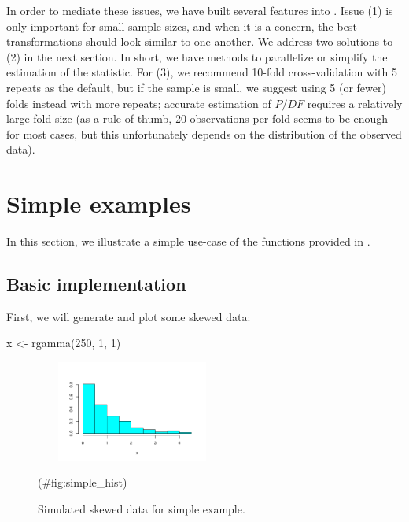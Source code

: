 In order to mediate these issues, we have built several features into
. Issue (1) is only important for small sample sizes,
and when it is a concern, the best transformations should look similar
to one another. We address two solutions to (2) in the next section. In
short, we have methods to parallelize or simplify the estimation of the
statistic. For (3), we recommend 10-fold cross-validation with 5 repeats
as the default, but if the sample is small, we suggest using 5 (or
fewer) folds instead with more repeats; accurate estimation of \(P/DF\)
requires a relatively large fold size (as a rule of thumb, 20
observations per fold seems to be enough for most cases, but this
unfortunately depends on the distribution of the observed data).

\hypertarget{simple-examples}{%
\section{Simple examples}\label{simple-examples}}

In this section, we illustrate a simple use-case of the functions
provided in .

\hypertarget{basic-implementation}{%
\subsection{Basic implementation}\label{basic-implementation}}

First, we will generate and plot some skewed data:

\begin{Schunk}
\begin{Sinput}
x <- rgamma(250, 1, 1)
\end{Sinput}
\end{Schunk}

\begin{Schunk}
\begin{figure}

{\centering \includegraphics[width=2.5in,height=1.3in]{figs/simple_hist-1} 

}

\caption[Simulated skewed data for simple example]{Simulated skewed data for simple example.}(\#fig:simple_hist)
\end{figure}
\end{Schunk}

